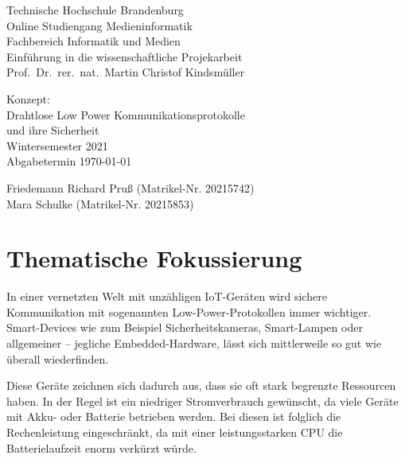 \documentclass{article}
\title{\titlecontent}
\author{Friedemann Richard Pruß, Mara Schulke}
\begin{document}
\begin{titlepage}
	\begin{flushleft}
		Technische Hochschule Brandenburg \\
		Online Studiengang Medieninformatik \\
		Fachbereich Informatik und Medien \\
		Einführung in die wissenschaftliche Projekarbeit\\
		Prof.\ Dr.\ rer.\ nat.\ Martin Christof Kindsmüller
	\end{flushleft}

	\vfill

	\begin{center}
		\large{Konzept:}\\
		\Huge{
			Drahtlose Low Power Kommunikationsprotokolle\\
			und ihre Sicherheit
		}\\[0.5em]
		\large{Wintersemester 2021}\\[0.25em]
		\large{Abgabetermin \today}
	\end{center}

	\vfill

	\begin{flushright}
		Friedemann Richard Pruß (Matrikel-Nr. 20215742)\\
		Mara Schulke (Matrikel-Nr. 20215853)
	\end{flushright}
\end{titlepage}

\newpage

\tableofcontents

\section{Thematische Fokussierung}

In einer vernetzten Welt mit unzähligen IoT-Geräten wird sichere Kommunikation
mit sogenannten Low-Power-Protokollen immer wichtiger. Smart-Devices wie zum
Beispiel Sicherheitskameras, Smart-Lampen oder allgemeiner – jegliche
Embedded-Hardware, lässt sich mittlerweile so gut wie überall wiederfinden.

Diese Geräte zeichnen sich dadurch aus, dass sie oft stark begrenzte Ressourcen
haben. In der Regel ist ein niedriger Stromverbrauch gewünscht, da viele Geräte
mit Akku- oder Batterie betrieben werden. Bei diesen ist folglich die
Rechenleistung eingeschränkt, da mit einer leistungsstarken CPU die
Batterielaufzeit enorm verkürzt würde.
\end{document}
